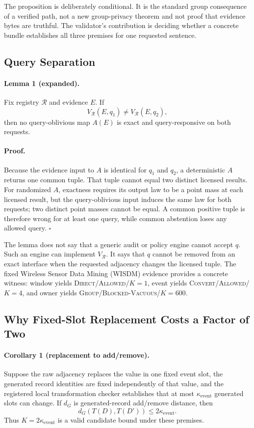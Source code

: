 \documentclass[letterpaper]{article} %
\newcommand{\Direct}{\textsc{Direct}}
\newcommand{\Convert}{\textsc{Convert}}
\newcommand{\Group}{\textsc{Group}}
\newcommand{\Allowed}{\textsc{Allowed}}
\newcommand{\ke}{\kappa_{\mathrm{event}}}
\begin{document}
The proposition is deliberately conditional.  It is the standard group
consequence of a verified path, not a new group-privacy theorem and not proof
that evidence bytes are truthful.  The validator's contribution is deciding
whether a concrete bundle establishes all three premises for one requested
sentence.

\subsection{Query Separation}

\paragraph{Lemma 1 (expanded).}
Fix registry $\mathcal R$ and evidence $E$.  If
\[
V_{\mathcal R}(E,q_1)\ne V_{\mathcal R}(E,q_2),
\]
then no query-oblivious map $A(E)$ is exact and query-responsive on both
requests.

\paragraph{Proof.}
Because the evidence input to $A$ is identical for $q_1$ and $q_2$, a
deterministic $A$ returns one common tuple.  That tuple cannot equal two
distinct licensed results.  For randomized $A$, exactness requires its output
law to be a point mass at each licensed result, but the query-oblivious input
induces the same law for both requests; two distinct point masses cannot be
equal.  A common positive tuple is therefore wrong for at least one query,
while common abstention loses any allowed query. \hfill$\square$

The lemma does not say that a generic audit or policy engine cannot accept
$q$.  Such an engine can implement $V_{\mathcal R}$.  It says that $q$ cannot
be removed from an exact interface when the requested adjacency changes the
licensed tuple.  The fixed Wireless Sensor Data Mining (WISDM) evidence
provides a concrete witness:
window yields \Direct{}/\Allowed{}/$K=1$, event yields
\Convert{}/\Allowed{}/$K=4$, and owner yields
\Group{}/\textsc{Blocked-Vacuous}/$K=600$.

\subsection{Why Fixed-Slot Replacement Costs a Factor of Two}

\paragraph{Corollary 1 (replacement to add/remove).}
Suppose the raw adjacency replaces the value in one fixed event slot, the
generated record identities are fixed independently of that value, and the
registered local transformation checker establishes that at most $\ke$
generated slots can change.  If $d_G$ is generated-record add/remove distance,
then
\[
  d_G(T(D),T(D'))\leq 2\ke.
\]
Thus $K=2\ke$ is a valid candidate bound under these premises.
\end{document}
